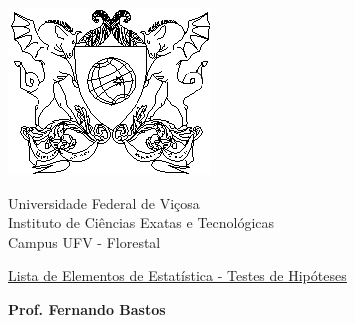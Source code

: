 \documentclass{report}
\begin{document}
\vspace*{-2cm}

\begin{center}
\begin{minipage}[s]{2cm}
\hspace{-1.3cm}\includegraphics[scale=1.0]{Figuras/brasaoufv.eps}
\end{minipage}
\begin{minipage}[s]{13cm}
{\begin{center} {\sc \Large Universidade Federal de Vi\c{c}osa}\\
{\sc \large Instituto de Ci\^encias Exatas e Tecnológicas}\\
{\sc \large Campus UFV - Florestal}\\
\end{center}}
\end{minipage}\begin{minipage}[s]{2 cm}
\end{minipage}
\end{center}

\vspace{-0.3cm}



\medskip

\begin{center}

\underline{\underline{{\large{\sc Lista de Elementos de Estatística - Testes de Hipóteses}}}}

\bigskip

{\large {\bf Prof. Fernando Bastos}}
%
\end{center}
\end{document}
